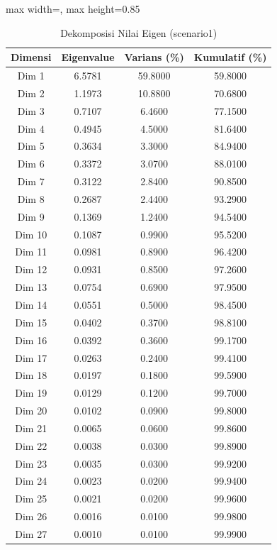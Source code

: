 \begin{table}[H]
\centering
\caption{Dekomposisi Nilai Eigen (scenario1)} \makeatletter{}\makeatother
\begin{adjustbox}{max width=\textwidth, max height=0.85\textheight}
\begin{tabular}{|c|c|c|c|}
\hline
\textbf{Dimensi} & \textbf{Eigenvalue} & \textbf{Varians (\%)} & \textbf{Kumulatif (\%)} \\
\hline
Dim 1 & 6.5781 & 59.8000 & 59.8000 \\
Dim 2 & 1.1973 & 10.8800 & 70.6800 \\
Dim 3 & 0.7107 & 6.4600 & 77.1500 \\
Dim 4 & 0.4945 & 4.5000 & 81.6400 \\
Dim 5 & 0.3634 & 3.3000 & 84.9400 \\
Dim 6 & 0.3372 & 3.0700 & 88.0100 \\
Dim 7 & 0.3122 & 2.8400 & 90.8500 \\
Dim 8 & 0.2687 & 2.4400 & 93.2900 \\
Dim 9 & 0.1369 & 1.2400 & 94.5400 \\
Dim 10 & 0.1087 & 0.9900 & 95.5200 \\
Dim 11 & 0.0981 & 0.8900 & 96.4200 \\
Dim 12 & 0.0931 & 0.8500 & 97.2600 \\
Dim 13 & 0.0754 & 0.6900 & 97.9500 \\
Dim 14 & 0.0551 & 0.5000 & 98.4500 \\
Dim 15 & 0.0402 & 0.3700 & 98.8100 \\
Dim 16 & 0.0392 & 0.3600 & 99.1700 \\
Dim 17 & 0.0263 & 0.2400 & 99.4100 \\
Dim 18 & 0.0197 & 0.1800 & 99.5900 \\
Dim 19 & 0.0129 & 0.1200 & 99.7000 \\
Dim 20 & 0.0102 & 0.0900 & 99.8000 \\
Dim 21 & 0.0065 & 0.0600 & 99.8600 \\
Dim 22 & 0.0038 & 0.0300 & 99.8900 \\
Dim 23 & 0.0035 & 0.0300 & 99.9200 \\
Dim 24 & 0.0023 & 0.0200 & 99.9400 \\
Dim 25 & 0.0021 & 0.0200 & 99.9600 \\
Dim 26 & 0.0016 & 0.0100 & 99.9800 \\
Dim 27 & 0.0010 & 0.0100 & 99.9900 \\

\end{tabular}
\end{adjustbox}
\end{table}
